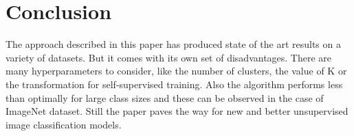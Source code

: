 
\section{Conclusion}
\label{sec:conc}


The approach described in this paper has produced state of the art results on a variety of datasets. 
But it comes with its own set of disadvantages. There are many hyperparameters to consider, like the number of clusters, the value of K or the transformation for self-supervised training. Also the algorithm performs less than optimally for large class sizes and these can be observed in the case of ImageNet dataset. Still the paper paves the way for new and better unsupervised image classification models.
